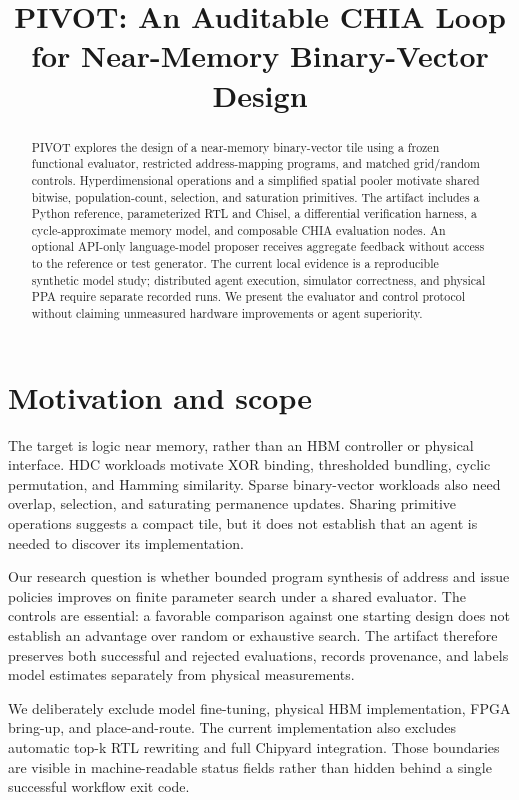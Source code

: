 \documentclass[conference]{IEEEtran}
\title{PIVOT: An Auditable CHIA Loop for Near-Memory Binary-Vector Design}
\author{\IEEEauthorblockN{Author names to be supplied by the team}
\IEEEauthorblockA{Affiliation and contact to be supplied}}
\begin{document}
\maketitle
\begin{abstract}
PIVOT explores the design of a near-memory binary-vector tile using a frozen
functional evaluator, restricted address-mapping programs, and matched
grid/random controls. Hyperdimensional operations and a simplified spatial
pooler motivate shared bitwise, population-count, selection, and saturation
primitives. The artifact includes a Python reference, parameterized RTL and
Chisel, a differential verification harness, a cycle-approximate memory model,
and composable CHIA evaluation nodes. An optional API-only language-model
proposer receives aggregate feedback without access to the reference or test
generator. The current local evidence is a reproducible synthetic model study;
distributed agent execution, simulator correctness, and physical PPA require
separate recorded runs. We present the evaluator and control protocol without
claiming unmeasured hardware improvements or agent superiority.
\end{abstract}

\section{Motivation and scope}
The target is logic near memory, rather than an HBM controller or physical
interface. HDC workloads motivate XOR binding, thresholded bundling, cyclic
permutation, and Hamming similarity. Sparse binary-vector workloads also need
overlap, selection, and saturating permanence updates. Sharing primitive
operations suggests a compact tile, but it does not establish that an agent
is needed to discover its implementation.

Our research question is whether bounded program synthesis of address and
issue policies improves on finite parameter search under a shared evaluator.
The controls are essential: a favorable comparison against one starting design
does not establish an advantage over random or exhaustive search. The artifact
therefore preserves both successful and rejected evaluations, records provenance,
and labels model estimates separately from physical measurements.

We deliberately exclude model fine-tuning, physical HBM implementation, FPGA
bring-up, and place-and-route. The current implementation also excludes
automatic top-k RTL rewriting and full Chipyard integration. Those boundaries
are visible in machine-readable status fields rather than hidden behind a
single successful workflow exit code.
\end{document}
